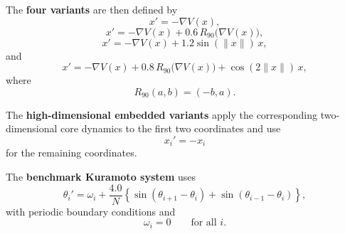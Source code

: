 The \textbf{four variants} are then defined by
\begin{equation}
x' = -\nabla V(x),
\end{equation}
\begin{equation}
x' = -\nabla V(x) + 0.6\, R_{90}\bigl(\nabla V(x)\bigr),
\end{equation}
\begin{equation}
x' = -\nabla V(x) + 1.2 \sin(\|x\|)\,x,
\end{equation}
and
\begin{equation}
x' = -\nabla V(x) + 0.8\, R_{90}\bigl(\nabla V(x)\bigr) + \cos(2\|x\|)\,x,
\end{equation}
where
\begin{equation}
R_{90}(a,b) = (-b,a).
\end{equation}

The \textbf{high-dimensional embedded variants} apply the corresponding two-dimensional core dynamics
to the first two coordinates and use
\begin{equation}
x_i' = -x_i
\end{equation}
for the remaining coordinates.

The \textbf{benchmark Kuramoto system} uses
\begin{equation}
\theta_i' = \omega_i + \frac{4.0}{N}
\left\{
\sin(\theta_{i+1}-\theta_i)
+
\sin(\theta_{i-1}-\theta_i)
\right\},
\end{equation}
with periodic boundary conditions and
\begin{equation}
\omega_i = 0
\qquad
\text{for all } i.
\end{equation}

